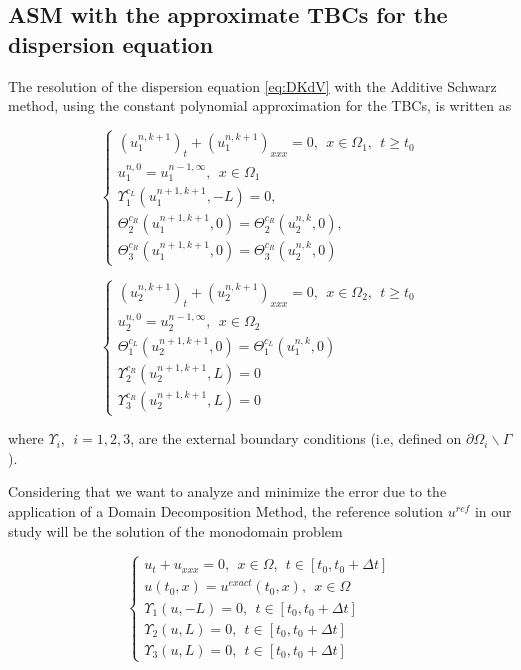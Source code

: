 \subsection{ASM with the approximate TBCs for the dispersion equation}

\indent The resolution of the dispersion equation \eqref{eq:DKdV} with the Additive Schwarz method, using the constant polynomial approximation for the TBCs, is written as

\begin{equation}
    \label{eq:problemDDM1}
    \begin{cases}
        (u_1^{n,k+1})_t + (u_1^{n,k+1})_{xxx} = 0 , \ \ x \in \Omega_1, \ \ t \geq t_0\\
        u_1^{n,0} = u_1^{n-1,\infty} , \ \ x \in \Omega_1 \\
        \Upsilon_1^{c_L}(u_1^{n+1,k+1},-L) = 0, \\ 
        \Theta_2^{c_R}(u_1^{n+1,k+1},0) = \Theta_2^{c_R}(u_2^{n,k},0) , \\
        \Theta_3^{c_R}(u_1^{n+1,k+1},0) = \Theta_3^{c_R}(u_2^{n,k},0)
     \end{cases}
\end{equation}

\begin{equation}
    \label{eq:problemDDM2}
    \begin{cases}
        (u_2^{n,k+1})_t + (u_2^{n,k+1})_{xxx} = 0 , \ \ x \in \Omega_2, \ \ t \geq t_0\\
        u_2^{n,0} = u_2^{n-1,\infty} , \ \ x \in \Omega_2 \\
        \Theta_1^{c_L}(u_2^{n+1,k+1},0) = \Theta_1^{c_L}(u_1^{n,k},0) \\
        \Upsilon_2^{c_R}(u_2^{n+1,k+1},L) = 0 \\
        \Upsilon_3^{c_R}(u_2^{n+1,k+1},L) = 0
     \end{cases}
\end{equation}

\noindent where $ \Upsilon_i, \ \ i=1,2,3$, are the external boundary conditions (i.e, defined on $\partial \Omega_i \backslash \Gamma$).

\indent Considering that we want to analyze and minimize the error due to the application of a Domain Decomposition Method, the reference solution $u^{ref}$ in our study will be the solution of the monodomain problem

\begin{equation}
	\label{eq:problemMonodomain}
	\begin{cases}
	u_t + u_{xxx} = 0, \ \ x \in \Omega, \ \ t \in [t_0, t_0+\Delta t] \\
	u(t_0,x) = u^{exact}(t_0,x) , \ \ x \in \Omega \\ 
	\Upsilon_1(u,-L) = 0, \ \ t \in [t_0, t_0+\Delta t] \\
	\Upsilon_2(u,L) = 0, \ \ t \in [t_0, t_0+\Delta t] \\
	\Upsilon_3(u,L) = 0, \ \ t \in [t_0, t_0+\Delta t]
	\end{cases}
\end{equation}
	

